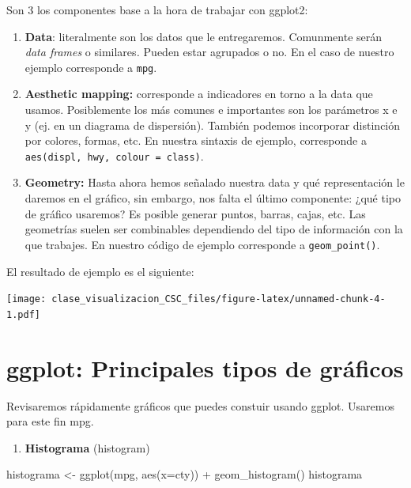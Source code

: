 \documentclass[
]{book}
\newenvironment{Shaded}{\begin{snugshade}}{\end{snugshade}}
\newcommand{\AttributeTok}[1]{\textcolor[rgb]{0.77,0.63,0.00}{#1}}
\newcommand{\FunctionTok}[1]{\textcolor[rgb]{0.00,0.00,0.00}{#1}}
\newcommand{\NormalTok}[1]{#1}
\newcommand{\OtherTok}[1]{\textcolor[rgb]{0.56,0.35,0.01}{#1}}
\newcommand{\SpecialCharTok}[1]{\textcolor[rgb]{0.00,0.00,0.00}{#1}}
\providecommand{\tightlist}{%
  \setlength{\itemsep}{0pt}\setlength{\parskip}{0pt}}
\begin{document}
Son 3 los componentes base a la hora de trabajar con ggplot2:

\begin{enumerate}
\def\labelenumi{\arabic{enumi}.}
\tightlist
\item
  \textbf{Data}: literalmente son los datos que le entregaremos. Comunmente serán \emph{data frames} o similares\emph{.} Pueden estar agrupados o no. En el caso de nuestro ejemplo corresponde a \texttt{mpg}.
\item
  \textbf{Aesthetic mapping:} corresponde a indicadores en torno a la data que usamos. Posiblemente los más comunes e importantes son los parámetros x e y (ej. en un diagrama de dispersión). También podemos incorporar distinción por colores, formas, etc. En nuestra sintaxis de ejemplo, corresponde a \texttt{aes(displ,\ hwy,\ colour\ =\ class)}.
\item
  \textbf{Geometry:} Hasta ahora hemos señalado nuestra data y qué representación le daremos en el gráfico, sin embargo, nos falta el último componente: ¿qué tipo de gráfico usaremos? Es posible generar puntos, barras, cajas, etc. Las geometrías suelen ser combinables dependiendo del tipo de información con la que trabajes. En nuestro código de ejemplo corresponde a \texttt{geom\_point()}.
\end{enumerate}

El resultado de ejemplo es el siguiente:

\texttt{[image: clase\_visualizacion\_CSC\_files/figure-latex/unnamed-chunk-4-1.pdf]}

\hypertarget{ggplot-principales-tipos-de-gruxe1ficos}{%
\chapter{ggplot: Principales tipos de gráficos}\label{ggplot-principales-tipos-de-gruxe1ficos}}

Revisaremos rápidamente gráficos que puedes constuir usando ggplot. Usaremos para este fin mpg.

\begin{enumerate}
\def\labelenumi{\arabic{enumi}.}
\tightlist
\item
  \textbf{Histograma} (histogram)
\end{enumerate}

\begin{Shaded}
\begin{Highlighting}[]
\NormalTok{histograma }\OtherTok{\textless{}{-}} \FunctionTok{ggplot}\NormalTok{(mpg, }\FunctionTok{aes}\NormalTok{(}\AttributeTok{x=}\NormalTok{cty)) }\SpecialCharTok{+} 
  \FunctionTok{geom\_histogram}\NormalTok{()}
\NormalTok{histograma}
\end{Highlighting}
\end{Shaded}
\end{document}

